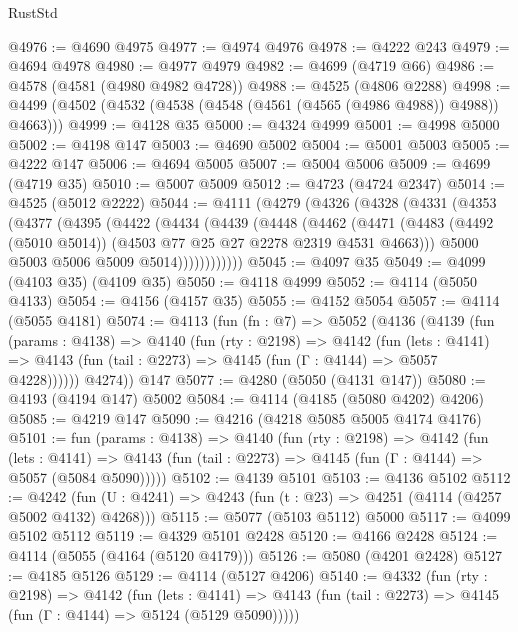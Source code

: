 \begin{lexlean}{RustStd}
\begin{coremodule}
{\begin{coremodule}
{{{{{{{{{{{{{{@4976 := @4690 @4975
@4977 := @4974 @4976
@4978 := @4222 @243
@4979 := @4694 @4978
@4980 := @4977 @4979
@4982 := @4699 (@4719 @66)
@4986 := @4578 (@4581 (@4980 @4982 @4728))
@4988 := @4525 (@4806 @2288)
@4998 := @4499 (@4502 (@4532 (@4538 (@4548 (@4561 (@4565 (@4986 @4988)) @4988)) @4663)))
@4999 := @4128 @35
@5000 := @4324 @4999
@5001 := @4998 @5000
@5002 := @4198 @147
@5003 := @4690 @5002
@5004 := @5001 @5003
@5005 := @4222 @147
@5006 := @4694 @5005
@5007 := @5004 @5006
@5009 := @4699 (@4719 @35)
@5010 := @5007 @5009
@5012 := @4723 (@4724 @2347)
@5014 := @4525 (@5012 @2222)
@5044 := @4111
    (@4279
      (@4326
        (@4328
          (@4331
            (@4353
              (@4377
                (@4395
                  (@4422
                    (@4434
                      (@4439
                        (@4448
                          (@4462
                            (@4471
                              (@4483
                                (@4492 (@5010 @5014))
                                (@4503 @77 @25 @27 @2278 @2319 @4531 @4663)))
                            @5000
                            @5003
                            @5006
                            @5009
                            @5014))))))))))))
@5045 := @4097 @35
@5049 := @4099 (@4103 @35) (@4109 @35)
@5050 := @4118 @4999
@5052 := @4114 (@5050 @4133)
@5054 := @4156 (@4157 @35)
@5055 := @4152 @5054
@5057 := @4114 (@5055 @4181)
@5074 := @4113
    (fun (fn : @7) =>
    @5052
      (@4136
        (@4139
          (fun (params : @4138) =>
          @4140
            (fun (rty : @2198) =>
            @4142
              (fun (lets : @4141) =>
              @4143 (fun (tail : @2273) => @4145 (fun (Γ : @4144) => @5057 @4228))))))
        @4274))
    @147
@5077 := @4280 (@5050 (@4131 @147))
@5080 := @4193 (@4194 @147) @5002
@5084 := @4114 (@4185 (@5080 @4202) @4206)
@5085 := @4219 @147
@5090 := @4216 (@4218 @5085 @5005 @4174 @4176)
@5101 := fun (params : @4138) =>
  @4140
    (fun (rty : @2198) =>
    @4142
      (fun (lets : @4141) =>
      @4143 (fun (tail : @2273) => @4145 (fun (Γ : @4144) => @5057 (@5084 @5090)))))
@5102 := @4139 @5101
@5103 := @4136 @5102
@5112 := @4242 (fun (U : @4241) => @4243 (fun (t : @23) => @4251 (@4114 (@4257 @5002 @4132) @4268)))
@5115 := @5077 (@5103 @5112) @5000
@5117 := @4099 @5102 @5112
@5119 := @4329 @5101 @2428
@5120 := @4166 @2428
@5124 := @4114 (@5055 (@4164 (@5120 @4179)))
@5126 := @5080 (@4201 @2428)
@5127 := @4185 @5126
@5129 := @4114 (@5127 @4206)
@5140 := @4332
    (fun (rty : @2198) =>
    @4142
      (fun (lets : @4141) =>
      @4143 (fun (tail : @2273) => @4145 (fun (Γ : @4144) => @5124 (@5129 @5090)))))
}}}}}}}}}}}}}}
\end{coremodule}}
\end{coremodule}
\end{lexlean}
